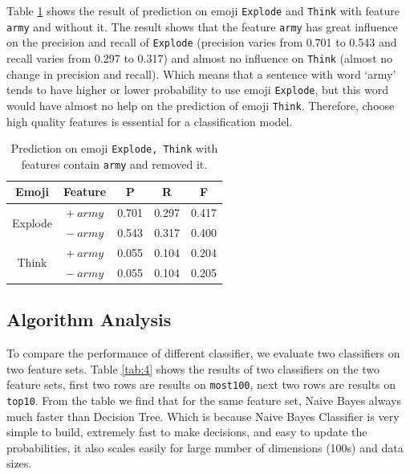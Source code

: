 \documentclass[11pt]{article}
\begin{document}
Table \ref{tab:2} shows the result of prediction on emoji \texttt{Explode} and \texttt{Think} with feature \texttt{army} and without it. The result shows that the feature \texttt{army} has great influence on the precision and recall of \texttt{Explode} (precision varies from 0.701 to 0.543 and recall varies from 0.297 to 0.317) and almost no influence on \texttt{Think} (almost no change in precision and recall). Which means that a sentence with word `army' tends to have higher or lower probability to use emoji \texttt{Explode},  but this word would have almost no help on the prediction of emoji \texttt{Think}. Therefore, choose high quality features is essential for a classification model.
\begin{table}[h]
	\centering
	\begin{tabular}{c|c|ccc}
		\hline
		\textbf{Emoji} & \textbf{Feature} & \textbf{P} & \textbf{R} & \textbf{F}  \\
		\hline
		\multirow{2}{*}{Explode} & $+\ army$ & 0.701   &   0.297   & 0.417 \\
		& $-\ army$ & 0.543    &  0.317   & 0.400 \\
		\hline
		\multirow{2}{*}{Think} & $+\ army$ & 0.055  &  0.104   &   0.204 \\
		& $-\ army$ & 0.055 &   0.104    &  0.205 \\
		\hline
	\end{tabular}
	\caption{Prediction on emoji \texttt{Explode, Think} with features contain \texttt{army} and removed it.}
	\label{tab:2}
\end{table}

\subsection{Algorithm Analysis}

To compare the performance of different classifier, we evaluate two classifiers on two feature sets. Table \ref{tab:4} shows the results of two classifiers on the two feature sets, first two rows are results on \texttt{most100}, next two rows are results on \texttt{top10}. From the table we find that for the same feature set, Naive Bayes always much faster than Decision Tree. Which is because Naive Bayes Classifier is very simple to build, extremely fast to make decisions, and easy to update the probabilities, it also scales easily for large number of dimensions (100s) and data sizes. 
\end{document}
